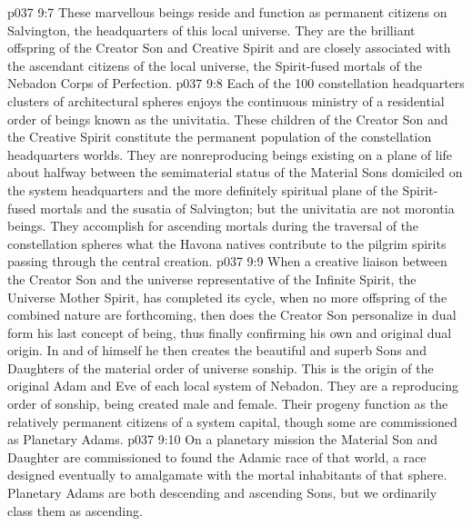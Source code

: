\vs p037 9:7 \pc {} These marvellous beings reside and function as permanent citizens on Salvington, the headquarters of this local universe. They are the brilliant offspring of the Creator Son and Creative Spirit and are closely associated with the ascendant citizens of the local universe, the Spirit\hyp{}fused mortals of the Nebadon Corps of Perfection.
\vs p037 9:8 \pc {} Each of the 100 constellation headquarters clusters of architectural spheres enjoys the continuous ministry of a residential order of beings known as the univitatia. These children of the Creator Son and the Creative Spirit constitute the permanent population of the constellation headquarters worlds. They are nonreproducing beings existing on a plane of life about halfway between the semimaterial status of the Material Sons domiciled on the system headquarters and the more definitely spiritual plane of the Spirit\hyp{}fused mortals and the susatia of Salvington; but the univitatia are not morontia beings. They accomplish for ascending mortals during the traversal of the constellation spheres what the Havona natives contribute to the pilgrim spirits passing through the central creation.
\vs p037 9:9 \pc {} When a creative liaison between the Creator Son and the universe representative of the Infinite Spirit, the Universe Mother Spirit, has completed its cycle, when no more offspring of the combined nature are forthcoming, then does the Creator Son personalize in dual form his last concept of being, thus finally confirming his own and original dual origin. In and of himself he then creates the beautiful and superb Sons and Daughters of the material order of universe sonship. This is the origin of the original Adam and Eve of each local system of Nebadon. They are a reproducing order of sonship, being created male and female. Their progeny function as the relatively permanent citizens of a system capital, though some are commissioned as Planetary Adams.
\vs p037 9:10 On a planetary mission the Material Son and Daughter are commissioned to found the Adamic race of that world, a race designed eventually to amalgamate with the mortal inhabitants of that sphere. Planetary Adams are both descending and ascending Sons, but we ordinarily class them as ascending.
